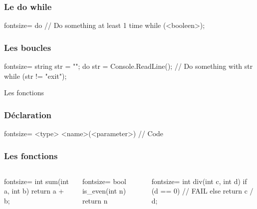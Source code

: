 \begin{frame}[fragile]
  \frametitle{Le do while}

  \begin{csharpcode*}{fontsize=\scriptsize}
    do
    {
      // Do something at least 1 time
    } while (<booleen>);
  \end{csharpcode*}
\end{frame}

\begin{frame}[fragile]
  \frametitle{Les boucles}

  \begin{csharpcode*}{fontsize=\scriptsize}
    string str = "";
    do
    {
      str = Console.ReadLine();
      // Do something with str
    } while (str != "exit");
  \end{csharpcode*}
\end{frame}

\begin{frame}
  \begin{center}
    \vspace{1cm}
    Les fonctions
  \end{center}
\end{frame}

\begin{frame}[fragile]
  \frametitle{Déclaration}

  \begin{csharpcode*}{fontsize=\scriptsize}
    <type> <name>(<parameter>)
    {
      // Code
    }
  \end{csharpcode*}
\end{frame}

\begin{frame}[fragile]
  \frametitle{Les fonctions}

  \begin{columns}[c]
    \column{2.2in}
    \begin{csharpcode*}{fontsize=\scriptsize}
      int sum(int a, int b)
      {
        return a + b;
      }
    \end{csharpcode*}

    \pause

    \begin{csharpcode*}{fontsize=\scriptsize}
      bool is_even(int n)
      {
        return n %
      }
    \end{csharpcode*}

    \pause

    \column{2.3in}
    \begin{csharpcode*}{fontsize=\scriptsize}
      int div(int c, int d)
      {
        if (d == 0)
        {
          // FAIL
        }
        else
          return c / d;
      }
    \end{csharpcode*}
  \end{columns}
\end{frame}

